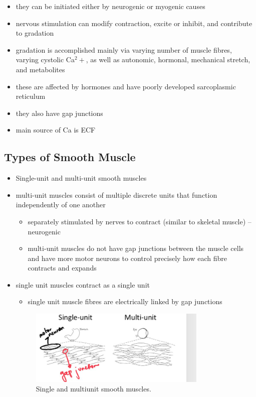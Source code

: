 \documentclass[10pt]{article}
\begin{document}
\begin{itemize}
    \item they can be initiated either by neurogenic or myogenic causes
    \item nervous stimulation can modify contraction, excite or inhibit, and contribute to gradation
    \item gradation is accomplished mainly via varying number of muscle fibres, varying cystolic Ca$^2+$, as well as autonomic, hormonal, mechanical stretch, and metabolites
    \item these are affected by hormones and have poorly developed sarcoplasmic reticulum
    \item they also have gap junctions
    \item main source of Ca is ECF
\end{itemize}

\subsection{Types of Smooth Muscle}
\begin{itemize}
    \item Single-unit and multi-unit smooth muscles 
    \item multi-unit muscles consist of multiple discrete units that function independently of one another 
        \begin{itemize}
            \item separately stimulated by nerves to contract (similar to skeletal muscle) -- neurogenic
            \item multi-unit muscles do not have gap junctions between the muscle cells and have more motor neurons to control precisely how each fibre contracts and expands
        \end{itemize}
    \item single unit muscles contract as a single unit
        \begin{itemize}
            \item single unit muscle fibres are electrically linked by gap junctions
        \end{itemize}
        \begin{figure}[h]
            \centering
            \includegraphics[width=0.8\textwidth]{singleMultiUnitSmoothMuscles.jpeg}
            \caption{Single and multiunit smooth muscles.}
            \label{fig:singleMultiUnitSmoothMuscles}
        \end{figure}
\end{itemize}
\end{document}
